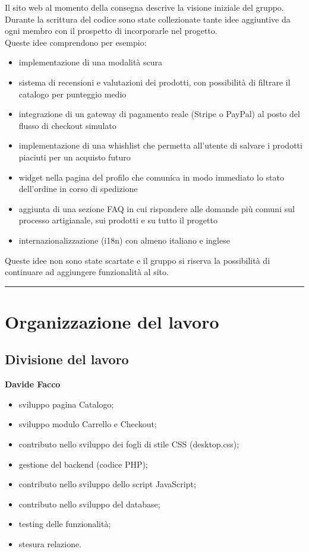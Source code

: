 \documentclass[11pt,a4paper]{article}
\newcommand{\sectionrule}{\vspace{0.5em}\noindent\rule{\linewidth}{0.4pt}\vspace{0.5em}}
\begin{document}
Il sito web al momento della consegna descrive la visione iniziale del gruppo. Durante la scrittura del codice sono state collezionate tante idee aggiuntive da ogni membro con il prospetto di incorporarle nel progetto.\\
Queste idee comprendono per esempio:
\begin{itemize}
  \item implementazione di una modalit\`a scura
  \item sistema di recensioni e valutazioni dei prodotti, con possibilit\`a di filtrare il catalogo per punteggio medio
  \item integrazione di un gateway di pagamento reale (Stripe o PayPal) al posto del flusso di checkout simulato
  \item implementazione di una whishlist che permetta all'utente di salvare i prodotti piaciuti per un acquisto futuro
  \item widget nella pagina del profilo che comunica in modo immediato lo stato dell'ordine in corso di spedizione
  \item aggiunta di una sezione FAQ in cui rispondere alle domande più comuni sul processo artigianale, sui prodotti e su tutto il progetto
  \item internazionalizzazione (i18n) con almeno italiano e inglese
\end{itemize}
Queste idee non sono state scartate e il gruppo si riserva la possibilit\`a di continuare ad aggiungere funzionalit\`a al sito.

\sectionrule

%
\section{Organizzazione del lavoro}

\subsection{Divisione del lavoro}

\textbf{Davide Facco}
\begin{itemize}
  \item sviluppo pagina Catalogo;
  \item sviluppo modulo Carrello e Checkout;
  \item contributo nello sviluppo dei fogli di stile CSS (desktop.css);
  \item gestione del backend (codice PHP);
  \item contributo nello sviluppo dello script JavaScript;
  \item contributo nello sviluppo del database;
  \item testing delle funzionalit\`a;
  \item stesura relazione.
\end{itemize}
\end{document}
